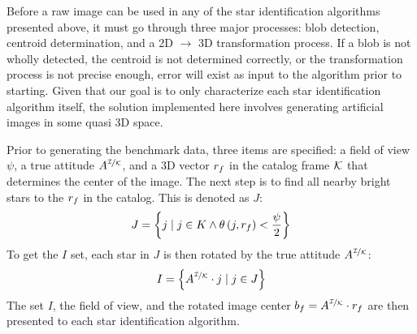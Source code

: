 Before a raw image can be used in any of the star identification algorithms presented above, it must go through
three major processes: blob detection, centroid determination, and a 2D $\rightarrow$ 3D transformation process.
If a blob is not wholly detected, the centroid is not determined correctly, or the transformation process
is not precise enough, error will exist as input to the algorithm prior to starting.
Given that our goal is to only characterize each star identification algorithm itself, the solution implemented here
involves generating artificial images in some quasi 3D space.

Prior to generating the benchmark data, three items are specified: a field of view $\psi$, a true attitude
$A^{\nicefrac{\mathcal{I}}{\mathcal{K}}}$, and a 3D vector $r_f$ in the catalog frame $\mathcal{K}$ that determines
the center of the image.
The next step is to find all nearby bright stars to the $r_f$ in the catalog.
This is denoted as $J$:
\begin{equation}
    J = \left\{  j \mid j \in K \land \theta\left( j, r_f \right) < \frac{\psi}{2}  \right\}
\end{equation}
To get the $I$ set, each star in $J$ is then rotated by the true attitude $A^{\nicefrac{\mathcal{I}}{\mathcal{K}}}$:
\begin{equation}
    I = \left\{  A^{\nicefrac{\mathcal{I}}{\mathcal{K}}} \cdot j \mid j \in J  \right\}
\end{equation}
The set $I$, the field of view, and the rotated image center $b_f = A^{\nicefrac{\mathcal{I}}{\mathcal{K}}} \cdot r_f$
are then presented to each star identification algorithm.

